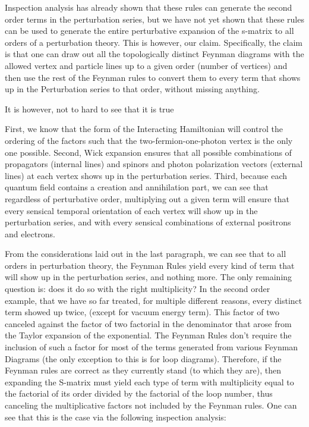 \documentclass[a4]{article}
\begin{document}
    Inspection analysis has already shown that these rules can generate the second order terms in the perturbation series, but we have not yet
    shown that these rules can be used to generate the entire perturbative expansion of the s-matrix to all orders of a perturbation theory. This
    is however, our claim. Specifically, the claim is that one can draw out all the topologically distinct Feynman diagrams with the allowed vertex
    and particle lines up to a given order (number of vertices) and then use the rest of the Feynman rules to convert them to every term that shows
    up in the Perturbation series to that order, without missing anything.

    It is however, not to hard to see that it is true

    First, we know that the form of the Interacting Hamiltonian will control the ordering of the factors such that the two-fermion-one-photon vertex
    is the only one possible. Second, Wick expansion ensures that all possible combinations of propagators (internal lines) and spinors and photon
    polarization vectors (external lines) at each vertex shows up in the perturbation series. Third, because each quantum field contains a creation
    and annihilation part, we can see that regardless of perturbative order, multiplying out a given term will ensure that every sensical temporal
    orientation of each vertex will show up in the perturbation series, and with every sensical combinations of external positrons and electrons.

    From the considerations laid out in the last paragraph, we can see that to all orders in perturbation theory, the Feynman Rules yield every kind
    of term that will show up in the perturbation series, and nothing more. The only remaining question is: does it do so with the right multiplicity?
    In the second order example, that we have so far treated, for multiple different reasons, every distinct term showed up twice, (except for vacuum
    energy term). This factor of two canceled against the factor of two factorial in the denominator that arose from the Taylor expansion of the 
    exponential. The Feynman Rules don't require the inclusion of such a factor for most of the terms generated from various Feynman Diagrams (the only
    exception to this is for loop diagrams). Therefore, if the Feynman rules are correct as they currently stand (to which they are), then expanding
    the S-matrix must yield each type of term with multiplicity equal to the factorial of its order divided by the factorial of the loop number, thus
    canceling the multiplicative factors not included by the Feynman rules. One can see that this is the case via the following inspection analysis:
\end{document}
